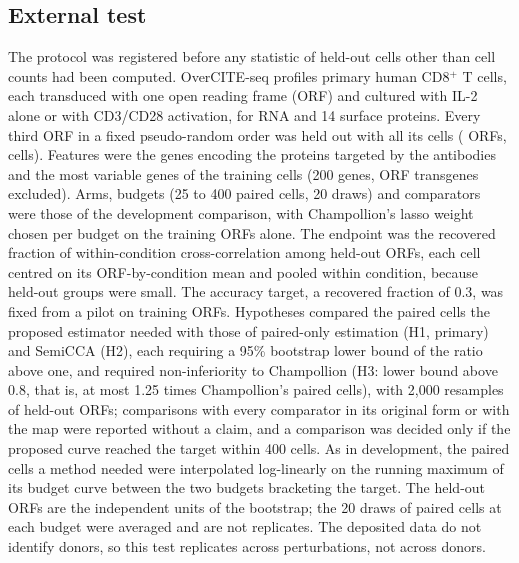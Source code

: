 \subsection*{External test}
The protocol was registered before any statistic of held-out cells other than cell counts had been computed. OverCITE-seq\cite{legut2022} profiles primary human CD8$^+$ T cells, each transduced with one open reading frame (ORF) and cultured with IL-2 alone or with CD3/CD28 activation, for RNA and 14 surface proteins. Every third ORF in a fixed pseudo-random order was held out with all its cells (\SpExOrfs{} ORFs, \SpExCells{} cells). Features were the genes encoding the proteins targeted by the antibodies and the most variable genes of the training cells (200 genes, ORF transgenes excluded). Arms, budgets (25 to 400 paired cells, 20 draws) and comparators were those of the development comparison, with Champollion's lasso weight chosen per budget on the training ORFs alone. The endpoint was the recovered fraction of within-condition cross-correlation among held-out ORFs, each cell centred on its ORF-by-condition mean and pooled within condition, because held-out groups were small. The accuracy target, a recovered fraction of 0.3, was fixed from a pilot on training ORFs. Hypotheses compared the paired cells the proposed estimator needed with those of paired-only estimation (H1, primary) and SemiCCA (H2), each requiring a 95\% bootstrap lower bound of the ratio above one, and required non-inferiority to Champollion (H3: lower bound above 0.8, that is, at most 1.25 times Champollion's paired cells), with 2,000 resamples of held-out ORFs; comparisons with every comparator in its original form or with the map were reported without a claim, and a comparison was decided only if the proposed curve reached the target within 400 cells. As in development, the paired cells a method needed were interpolated log-linearly on the running maximum of its budget curve between the two budgets bracketing the target. The \SpExOrfs{} held-out ORFs are the independent units of the bootstrap; the 20 draws of paired cells at each budget were averaged and are not replicates. The deposited data do not identify donors, so this test replicates across perturbations, not across donors.

